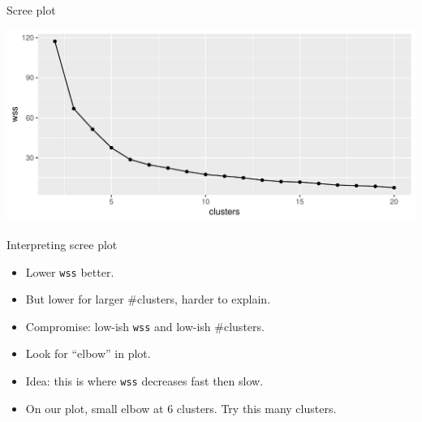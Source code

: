 \begin{frame}[fragile]{Scree plot}

\begin{knitrout}
\color{fgcolor}\begin{kframe}
\begin{alltt}
\hlkwb{=}
\hlstd{(}\hlopt{+}\hlstd{()}\hlopt{+}\hlstd{()}
\end{alltt}
\end{kframe}
\includegraphics[width=\maxwidth]{figure/favalli-1} 

\end{knitrout}
  
\end{frame}

\begin{frame}[fragile]{Interpreting scree plot}
  
  \begin{itemize}
  \item Lower \texttt{wss} better.
  \item But lower for larger \#clusters, harder to explain.
  \item Compromise: low-ish \texttt{wss} and low-ish \#clusters.
  \item Look for ``elbow'' in plot.
  \item Idea: this is where \texttt{wss} decreases fast then slow.
  \item On our plot, small elbow at 6 clusters. Try this many clusters.
  \end{itemize}
  
\end{frame}

